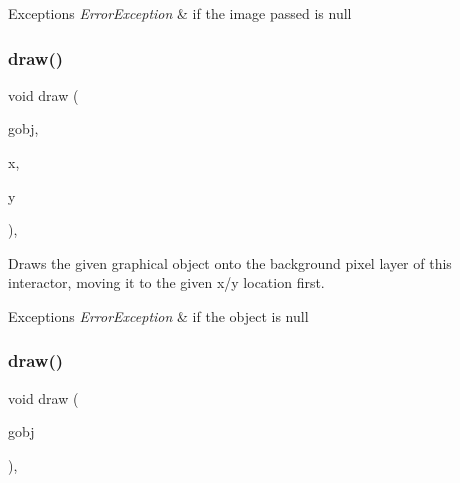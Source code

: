 \begin{DoxyExceptions}{Exceptions}
{\em Error\+Exception} & if the image passed is null \\
\hline
\end{DoxyExceptions}
\mbox{\label{classsgl_1_1GDrawingSurface_acc3825d7a24815d1e2f78e7c3ffea6cc}} 
\subsubsection{\texorpdfstring{draw()}{draw()}\hspace{0.1cm}{\footnotesize\ttfamily [1/5]}}
{\footnotesize\ttfamily void draw (\begin{DoxyParamCaption}\item[{\mbox{\hyperlink{classsgl_1_1GObject}{G\+Object}} $\ast$}]{gobj,  }\item[{double}]{x,  }\item[{double}]{y }\end{DoxyParamCaption})\hspace{0.3cm}{\ttfamily [virtual]}, {\ttfamily [inherited]}}



Draws the given graphical object onto the background pixel layer of this interactor, moving it to the given x/y location first. 


\begin{DoxyExceptions}{Exceptions}
{\em Error\+Exception} & if the object is null \\
\hline
\end{DoxyExceptions}
\mbox{\label{classsgl_1_1GDrawingSurface_a022a8d51c7fabcd79a0c809233e93453}} 
\subsubsection{\texorpdfstring{draw()}{draw()}\hspace{0.1cm}{\footnotesize\ttfamily [2/5]}}
{\footnotesize\ttfamily void draw (\begin{DoxyParamCaption}\item[{\mbox{\hyperlink{classsgl_1_1GObject}{G\+Object}} \&}]{gobj }\end{DoxyParamCaption})\hspace{0.3cm}{\ttfamily [virtual]}, {\ttfamily [inherited]}}



